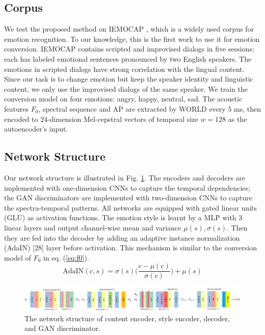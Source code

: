 \documentclass{article}
\begin{document}
\subsection{Corpus}
We test the proposed method on IEMOCAP \cite{busso2008iemocap}, which is a widely used corpus for emotion recognition. To our knowledge, this is the first work to use it for emotion conversion. IEMOCAP contains scripted and improvised dialogs in five sessions; each has labeled emotional sentences pronounced by two English speakers. The emotions in scripted dialogs have strong correlation with the lingual content. Since our task is to change emotion but keep the speaker identity and linguistic content, we only use the improvised dialogs of the same speaker. We train the conversion model on four emotions: angry, happy, neutral, sad. The acoustic features $F_0$, spectral sequence and AP are extracted by WORLD \cite{morise2016world} every $5$ ms, then encoded to $24$-dimension Mel-cepstral vectors of temporal size $w=128$ as the autoencoder's input.


\subsection{Network Structure}
Our network structure is illustrated in Fig. \ref{fig:NN}. The encoders and decoders are implemented with one-dimension CNNs to capture the temporal dependencies; the GAN discriminators are implemented with two-dimension CNNs to capture the spectra-temporal patterns. All networks are equipped with gated linear units (GLU) \cite{dauphin2017language} as activation functions. The emotion style is learnt by a MLP with 3 linear layers and output channel-wise mean and variance $\mu(s), \sigma(s)$. Then they are fed into the decoder by adding an adaptive instance normalization (AdaIN) [28] layer before activation. This mechanism is similar to the conversion model of $F_0$ in eq. (\ref{eq:f0}).
\begin{equation}
\text{AdaIN}(c,s) = \sigma(s)\Big(\frac{c-\mu(c)}{\sigma(c)}\Big) + \mu(s)
\end{equation}

\begin{figure}[t!]
\includegraphics[width=1.0\textwidth]{FIG/NN}
\caption{The network structure of content encoder, style encoder, decoder, and GAN discriminator.}
\label{fig:NN}
\end{figure}
\end{document}
